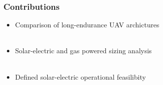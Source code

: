 \documentclass{beamer}
\begin{document}
\begin{frame}
    \frametitle{Contributions}

    \begin{itemize}
        \item Comparison of long-endurance UAV archictures \\~\\
        \item Solar-electric and gas powered sizing analysis \\~\\
        \item Defined solar-electric operational feasilibity \\~\\
        \end{itemize}


\end{frame}
\end{document}
